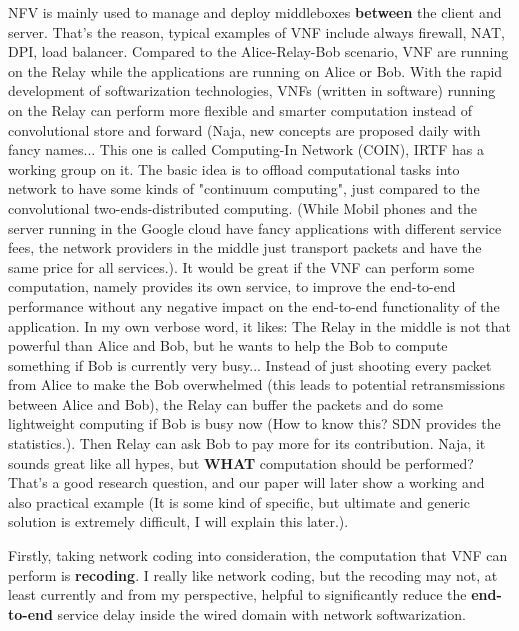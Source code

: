 \documentclass[12pt]{article}
\begin{document}
NFV is mainly used to manage and deploy middleboxes \textbf{between} the client and server. That's the reason, typical
examples of VNF include always firewall, NAT, DPI, load balancer. Compared to the Alice-Relay-Bob scenario, VNF are
running on the Relay while the applications are running on Alice or Bob. With the rapid development of softwarization
technologies, VNFs (written in software) running on the Relay can perform more flexible and smarter computation instead
of convolutional store and forward (Naja, new concepts are proposed daily with fancy names... This one is called
Computing-In Network (COIN), IRTF has a working group on it. The basic idea is to offload computational tasks into
network to have some kinds of "continuum computing", just compared to the convolutional two-ends-distributed computing.
(While Mobil phones and the server running in the Google cloud have fancy applications with different service fees, the
network providers in the middle just transport packets and have the same price for all services.). It would be great if
the VNF can perform some computation, namely provides its own service, to improve the end-to-end performance without any
negative impact on the end-to-end functionality of the application. In my own verbose word, it likes: The Relay in the
middle is not that powerful than Alice and Bob, but he wants to help the Bob to compute something if Bob is currently
very busy... Instead of just shooting every packet from Alice to make the Bob overwhelmed (this leads to potential
retransmissions between Alice and Bob), the Relay can buffer the packets and do some lightweight computing if Bob is
busy now (How to know this? SDN provides the statistics.). Then Relay can ask Bob to pay more for its contribution.
Naja, it sounds great like all hypes, but \textbf{WHAT} computation should be performed? That's a good research
question, and our paper will later show a working and also practical example (It is some kind of specific, but ultimate
and generic solution is extremely difficult, I will explain this later.).

Firstly, taking network coding into consideration, the computation that VNF can perform is \textbf{recoding}.
I really like network coding, but the recoding may not, at least currently and from my perspective,
helpful to significantly reduce the \textbf{end-to-end} service delay inside the wired domain with network
softwarization.
\end{document}
